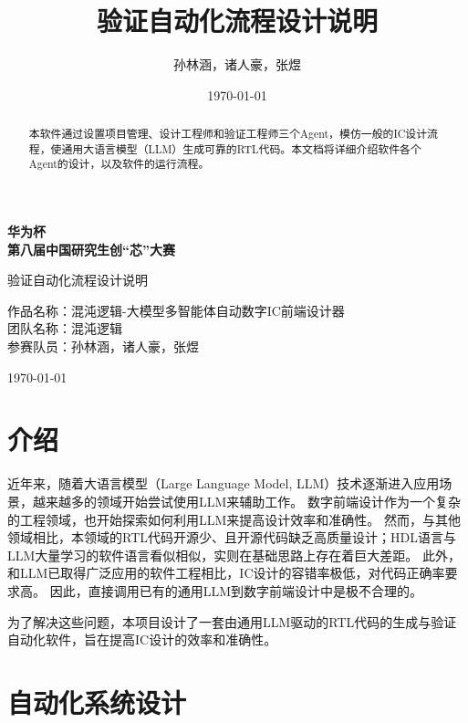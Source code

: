 \documentclass[UTF8]{ctexart}
\title{验证自动化流程设计说明}
\author{孙林涵，诸人豪，张煜}
\date{\today}
\begin{document}
\begin{titlepage}
    \centering
    \vspace*{3cm}
    
    {\Huge \bfseries 华为杯\\[1em]
    第八届中国研究生创“芯”大赛\\[3em]}
    
    {\LARGE 验证自动化流程设计说明\\[5em]}
    
    {\Large
    作品名称：混沌逻辑-大模型多智能体自动数字IC前端设计器\hspace{6cm} \\[2em]
    团队名称：混沌逻辑\hspace{6cm} \\[2em]
    参赛队员：孙林涵，诸人豪，张煜\hspace{6cm} \\[5em]
    }
    
    \vfill
    {\large \today}
\end{titlepage}

\tableofcontents

\begin{abstract}
本软件通过设置项目管理、设计工程师和验证工程师三个Agent，模仿一般的IC设计流程，使通用大语言模型（LLM）生成可靠的RTL代码。本文档将详细介绍软件各个Agent的设计，以及软件的运行流程。
\end{abstract}

\newpage

\section{介绍}
近年来，随着大语言模型（Large Language Model, LLM）技术逐渐进入应用场景，越来越多的领域开始尝试使用LLM来辅助工作。
数字前端设计作为一个复杂的工程领域，也开始探索如何利用LLM来提高设计效率和准确性。
然而，与其他领域相比，本领域的RTL代码开源少、且开源代码缺乏高质量设计；HDL语言与LLM大量学习的软件语言看似相似，实则在基础思路上存在着巨大差距。
此外，和LLM已取得广泛应用的软件工程相比，IC设计的容错率极低，对代码正确率要求高。
因此，直接调用已有的通用LLM到数字前端设计中是极不合理的。

为了解决这些问题，本项目设计了一套由通用LLM驱动的RTL代码的生成与验证自动化软件，旨在提高IC设计的效率和准确性。

\section{自动化系统设计}
\end{document}
